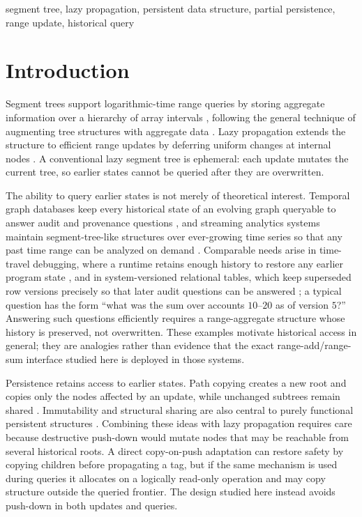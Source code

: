 \documentclass[conference]{IEEEtran}
\begin{document}
\begin{IEEEkeywords}
segment tree, lazy propagation, persistent data structure, partial persistence, range update,
historical query
\end{IEEEkeywords}

\section{Introduction}
\label{sec:intro}

Segment trees support logarithmic-time range queries by storing aggregate information over a
hierarchy of array intervals \cite{laaksonen2020guide}, following the general technique of
augmenting tree structures with aggregate data \cite{cormen2009introduction}. Lazy propagation
extends the structure to efficient range updates by deferring uniform changes at internal nodes
\cite{laaksonen2020guide}. A conventional lazy segment tree is ephemeral: each update mutates the
current tree, so earlier states cannot be queried after they are overwritten.

The ability to query earlier states is not merely of theoretical interest. Temporal graph
databases keep every historical state of an evolving graph queryable to answer audit and
provenance questions \cite{hou2024aeong}, and streaming analytics systems maintain
segment-tree-like structures over ever-growing time series so that any past time range can be
analyzed on demand \cite{qiu2024tucket}. Comparable needs arise in time-travel debugging, where
a runtime retains enough history to restore any earlier program state \cite{barr2014tardis}, and
in system-versioned relational tables, which keep superseded row versions precisely so that
later audit questions can be answered \cite{kulkarni2012temporal}; a typical question has the
form ``what was the sum over accounts $10$--$20$ as of version $5$?'' Answering such questions
efficiently requires a range-aggregate structure whose history is preserved, not overwritten.
These examples motivate historical access in general; they are analogies rather than evidence
that the exact range-add/range-sum interface studied here is deployed in those systems.

Persistence retains access to earlier states. Path copying creates a new root and copies only the
nodes affected by an update, while unchanged subtrees remain shared
\cite{driscoll1989persistent}. Immutability and structural sharing are also central to purely
functional persistent structures \cite{okasaki1998purely}. Combining these ideas with lazy
propagation requires care because destructive push-down would mutate nodes that may be reachable
from several historical roots. A direct copy-on-push adaptation can restore safety by copying
children before propagating a tag, but if the same mechanism is used during queries it allocates
on a logically read-only operation and may copy structure outside the queried frontier. The
design studied here instead avoids push-down in both updates and queries.
\end{document}
